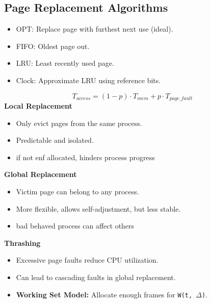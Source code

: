 \documentclass[8pt,twocolumn]{article}
\begin{document}
\subsection*{Page Replacement Algorithms}
\begin{itemize}
    \setlength{\itemsep}{0pt} %
    \setlength{\parskip}{0pt}
  \item OPT: Replace page with furthest next use (ideal).
  \item FIFO: Oldest page out.
  \item LRU: Least recently used page.
  \item Clock: Approximate LRU using reference bits.
\end{itemize}
\vspace{-1.0em}
\[
T_{access} = (1 - p) \cdot T_{mem} + p \cdot T_{page\_fault}
\]
\textbf{Local Replacement}
\vspace{-1.0em}
\begin{itemize}
    \setlength{\itemsep}{0pt} %
    \setlength{\parskip}{0pt}
  \item Only evict pages from the same process.
  \item Predictable and isolated.
  \item if not enf allocated, hinders process progress
\end{itemize}
\vspace{-0.6em}
\textbf{Global Replacement}
\vspace{-0.6em}
\begin{itemize}
    \setlength{\itemsep}{0pt} %
    \setlength{\parskip}{0pt}
  \item Victim page can belong to any process.
  \item More flexible, allows self-adjustment, but less stable.
  \item bad behaved process can affect others
\end{itemize}
\vspace{-0.6em}
\textbf{Thrashing}
\vspace{-0.6em}
\begin{itemize}
    \setlength{\itemsep}{0pt} %
    \setlength{\parskip}{0pt}
  \item Excessive page faults reduce CPU utilization.
  \item Can lead to cascading faults in global replacement.
  \item \textbf{Working Set Model:} Allocate enough frames for \texttt{W(t, $\Delta$)}.
\end{itemize}
\end{document}
